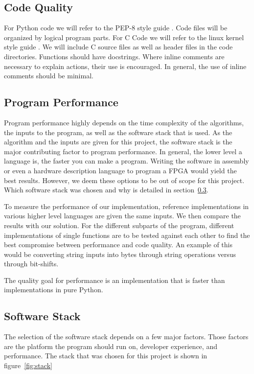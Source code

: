 \subsection{Code Quality}
\label{ch:codequality}
For Python code we will refer to the PEP-8 style guide \cite{pep8}. Code files will be organized by logical program parts. For C Code we will refer to the linux kernel style guide \cite{linuxkernel}. We will include C source files as well as header files in the code directories. Functions should have docstrings. Where inline comments are necessary to explain actions, their use is encouraged. In general, the use of inline comments should be minimal.

\subsection{Program Performance}
\label{ch:programperformance}
Program performance highly depends on the time complexity of the algorithms, the inputs to the program, as well as the software stack that is used. As the algorithm and the inputs are given for this project, the software stack is the major contributing factor to program performance. In general, the lower level a language is, the faster you can make a program. Writing the software in assembly or even a hardware description language to program a \ac{FPGA} would yield the best results. However, we deem these options to be out of scope for this project. Which software stack was chosen and why is detailed in section~\ref{ch:softwarestack}.

To measure the performance of our implementation, reference implementations in various higher level languages are given the same inputs. We then compare the results with our solution. For the different subparts of the program, different implementations of single functions are to be tested against each other to find the best compromise between performance and code quality. An example of this would be converting string inputs into bytes through string operations versus through bit-shifts.

The quality goal for performance is an implementation that is faster than implementations in pure Python.

\subsection{Software Stack}
\label{ch:softwarestack}
The selection of the software stack depends on a few major factors. Those factors are the platform the program should run on, developer experience, and performance. The stack that was chosen for this project is shown in figure~\ref{fig:stack}

